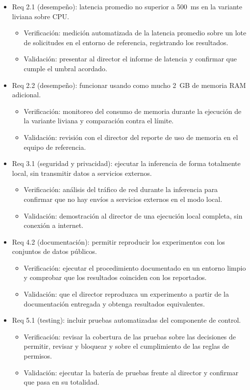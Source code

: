 \documentclass[
11pt, %
]{charter}
\begin{document}
\begin{itemize}
\item Req 2.1 (desempeño): latencia promedio no superior a 500~ms en la variante liviana sobre CPU.
	\begin{itemize}
		\item Verificación: medición automatizada de la latencia promedio sobre un lote de solicitudes en el entorno de referencia, registrando los resultados.
		\item Validación: presentar al director el informe de latencia y confirmar que cumple el umbral acordado.
	\end{itemize}

\item Req 2.2 (desempeño): funcionar usando como mucho 2~GB de memoria RAM adicional.
	\begin{itemize}
		\item Verificación: monitoreo del consumo de memoria durante la ejecución de la variante liviana y comparación contra el límite.
		\item Validación: revisión con el director del reporte de uso de memoria en el equipo de referencia.
	\end{itemize}

\item Req 3.1 (seguridad y privacidad): ejecutar la inferencia de forma totalmente local, sin transmitir datos a servicios externos.
	\begin{itemize}
		\item Verificación: análisis del tráfico de red durante la inferencia para confirmar que no hay envíos a servicios externos en el modo local.
		\item Validación: demostración al director de una ejecución local completa, sin conexión a internet.
	\end{itemize}

\item Req 4.2 (documentación): permitir reproducir los experimentos con los conjuntos de datos públicos.
	\begin{itemize}
		\item Verificación: ejecutar el procedimiento documentado en un entorno limpio y comprobar que los resultados coinciden con los reportados.
		\item Validación: que el director reproduzca un experimento a partir de la documentación entregada y obtenga resultados equivalentes.
	\end{itemize}

\item Req 5.1 (testing): incluir pruebas automatizadas del componente de control.
	\begin{itemize}
		\item Verificación: revisar la cobertura de las pruebas sobre las decisiones de permitir, revisar y bloquear y sobre el cumplimiento de las reglas de permisos.
		\item Validación: ejecutar la batería de pruebas frente al director y confirmar que pasa en su totalidad.
	\end{itemize}


\end{itemize}
\end{document}
